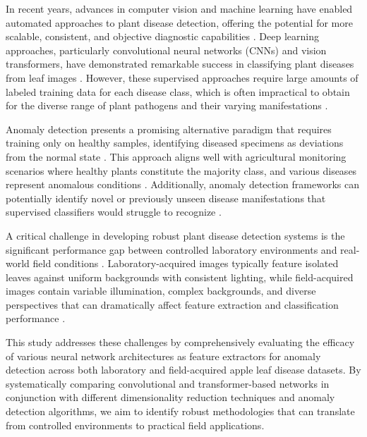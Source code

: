 \documentclass[12pt,a4paper,oneside]{report}
\begin{document}
In recent years, advances in computer vision and machine learning have enabled 
automated approaches to plant disease detection, offering the potential for more 
scalable, consistent, and objective diagnostic capabilities 
\cite{ferentinosDeepLearningModels2018,mohantyUsingDeepLearning2016}. 
Deep learning approaches, particularly 
convolutional neural networks (CNNs) and vision transformers, have demonstrated 
remarkable success in classifying plant diseases from leaf images 
\cite{singhEffectivePlantDisease2024}. However, these supervised approaches require large amounts 
of labeled training data for each disease class, which is often impractical to 
obtain for the diverse range of plant pathogens and their varying manifestations 
\cite{vallabhajosyulaNovelHierarchicalFramework2024}.

Anomaly detection presents a promising alternative paradigm that requires training 
only on healthy samples, identifying diseased specimens as deviations from the normal 
state \cite{ruffUnifyingReviewDeep2021,chalapathyDeepLearningAnomaly2019}. 
This approach aligns well with 
agricultural monitoring scenarios where healthy plants constitute the majority class, 
and various diseases represent anomalous conditions \cite{katafuchiImagebasedPlantDisease2021}. 
Additionally, 
anomaly detection frameworks can potentially identify novel or previously unseen 
disease manifestations that supervised classifiers would struggle to recognize
\cite{bumbacaSupportingScreeningNew2024}.

A critical challenge in developing robust plant disease detection systems is the 
significant performance gap between controlled laboratory environments and real-world 
field conditions \cite{todaHowConvolutionalNeural2019}. Laboratory-acquired images typically feature 
isolated leaves against uniform backgrounds with consistent lighting, while 
field-acquired images contain variable illumination, complex backgrounds, and 
diverse perspectives that can dramatically affect feature extraction and 
classification performance \cite{barbedoFactorsInfluencingUse2018}.

This study addresses these challenges by comprehensively evaluating the efficacy 
of various neural network architectures as feature extractors for anomaly detection 
across both laboratory and field-acquired apple leaf disease datasets. By 
systematically comparing convolutional and transformer-based networks in 
conjunction with different dimensionality reduction techniques and anomaly 
detection algorithms, we aim to identify robust methodologies that can translate 
from controlled environments to practical field applications.
\end{document}
